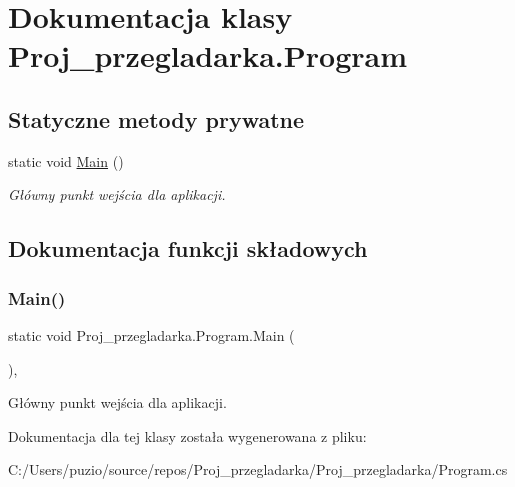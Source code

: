 \hypertarget{class_proj__przegladarka_1_1_program}{}\section{Dokumentacja klasy Proj\+\_\+przegladarka.\+Program}
\label{class_proj__przegladarka_1_1_program}
\subsection*{Statyczne metody prywatne}
\begin{DoxyCompactItemize}
\item 
static void \mbox{\hyperlink{class_proj__przegladarka_1_1_program_af184bb16090d97cd2637fd19a5e7d658}{Main}} ()
\begin{DoxyCompactList}\small\item\em Główny punkt wejścia dla aplikacji. \end{DoxyCompactList}\end{DoxyCompactItemize}


\subsection{Dokumentacja funkcji składowych}
\mbox{\label{class_proj__przegladarka_1_1_program_af184bb16090d97cd2637fd19a5e7d658}} 
\subsubsection{\texorpdfstring{Main()}{Main()}}
{\footnotesize\ttfamily static void Proj\+\_\+przegladarka.\+Program.\+Main (\begin{DoxyParamCaption}{ }\end{DoxyParamCaption})\hspace{0.3cm}{\ttfamily [static]}, {\ttfamily [private]}}



Główny punkt wejścia dla aplikacji. 



Dokumentacja dla tej klasy została wygenerowana z pliku\+:\begin{DoxyCompactItemize}
\item 
C\+:/\+Users/puzio/source/repos/\+Proj\+\_\+przegladarka/\+Proj\+\_\+przegladarka/Program.\+cs\end{DoxyCompactItemize}
